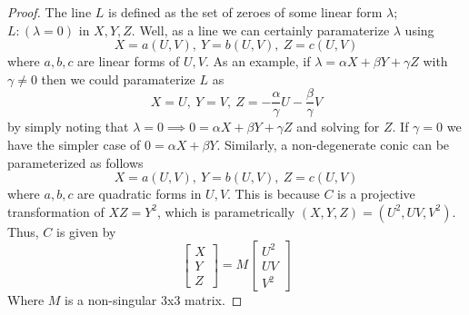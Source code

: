 \begin{proof}
The line $L$ is defined as the set of zeroes of some linear form $\lambda$; $L:(\lambda=0)$
in $X,Y,Z$. Well, as a line we can certainly paramaterize $\lambda$ using 
\[
X=a(U,V),~Y=b(U,V),~Z=c(U,V)
\]
where $a, b, c$ are linear forms of $U,V$. As an example, if $\lambda = \alpha X + \beta Y + \gamma Z$
with $\gamma \ne 0$ then we could paramaterize $L$ as
\[
X = U,~Y=V,~Z=-\frac{\alpha}{\gamma}U - \frac{\beta}{\gamma}V
\]
by simply noting that $\lambda = 0 \implies 0 = \alpha X + \beta Y + \gamma Z$ and solving
for $Z$. If $\gamma = 0$ we have the simpler case of $0 = \alpha X + \beta Y$.
Similarly, a non-degenerate conic can be parameterized as follows
\[
X=a(U,V),~Y=b(U,V),~Z=c(U,V)
\]
where $a,b,c$ are quadratic forms in $U,V$. This is because $C$ is a projective
transformation of $XZ=Y^2$, which is parametrically $(X,Y,Z) = (U^2,UV,V^2)$.
Thus, $C$ is given by 
\[
\begin{bmatrix}
X\\
Y\\
Z
\end{bmatrix}
=
M
\begin{bmatrix}
U^2\\
UV\\
V^2
\end{bmatrix}
\]
Where $M$ is a non-singular 3x3 matrix.
\end{proof}
